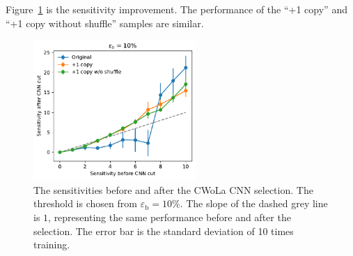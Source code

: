 \documentclass[12pt]{article}
\begin{document}
		Figure~\ref{fig:sensitivity_improvement_bkg_eff_01_copy_1_wo_shuffle} is the sensitivity improvement. The performance of the ``+1 copy'' and ``+1 copy without shuffle'' samples are similar.
		\begin{figure}[htpb]
			\centering
			\includegraphics[width=0.55\textwidth]{HVmodel_sensitivity_improvement_bkg_eff_10_copy_1_wo_shuffle.pdf}
			\caption{The sensitivities before and after the CWoLa CNN selection. The threshold is chosen from $\varepsilon_{\text{b}} = 10\%$. The slope of the dashed grey line is $1$, representing the same performance before and after the selection. The error bar is the standard deviation of 10 times training.}
			\label{fig:sensitivity_improvement_bkg_eff_01_copy_1_wo_shuffle}
		\end{figure}
\end{document}
